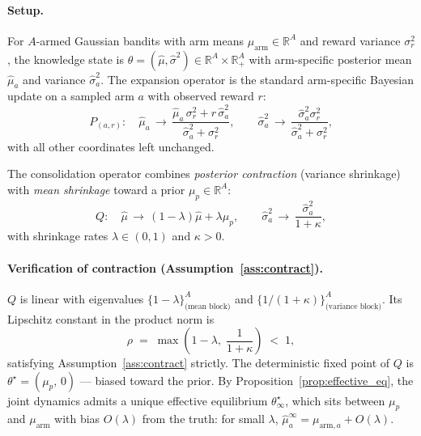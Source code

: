 \documentclass[12pt,a4paper]{article}
\newcommand{\R}{\mathbb{R}}
\begin{document}
\paragraph{Setup.}
For $A$-armed Gaussian bandits with arm means
$\mu_{\mathrm{arm}} \in \R^A$ and reward variance $\sigma_r^2$, the
knowledge state is $\theta = (\hat\mu, \hat\sigma^2) \in \R^A \times \R^A_+$
with arm-specific posterior mean $\hat\mu_a$ and variance $\hat\sigma_a^2$.
The expansion operator is the standard arm-specific Bayesian update on a
sampled arm $a$ with observed reward $r$:
\begin{equation}
\label{eq:bayesian_expansion}
P_{(a,r)}: \quad
  \hat\mu_a \,\to\, \frac{\hat\mu_a\,\sigma_r^2 + r\,\hat\sigma_a^2}{\hat\sigma_a^2 + \sigma_r^2},
  \qquad
  \hat\sigma_a^2 \,\to\, \frac{\hat\sigma_a^2 \sigma_r^2}{\hat\sigma_a^2 + \sigma_r^2},
\end{equation}
with all other coordinates left unchanged.

The consolidation operator combines \emph{posterior contraction} (variance
shrinkage) with \emph{mean shrinkage} toward a prior $\mu_p \in \R^A$:
\begin{equation}
\label{eq:bandit_Q}
Q: \quad
  \hat\mu \,\to\, (1-\lambda)\hat\mu + \lambda\mu_p,
  \qquad
  \hat\sigma_a^2 \,\to\, \frac{\hat\sigma_a^2}{1+\kappa},
\end{equation}
with shrinkage rates $\lambda \in (0, 1)$ and $\kappa > 0$.

\paragraph{Verification of contraction (Assumption~\ref{ass:contract}).}
$Q$ is linear with eigenvalues $\{1-\lambda\}^A_{\text{(mean block)}}$ and
$\{1/(1+\kappa)\}^A_{\text{(variance block)}}$. Its Lipschitz constant in
the product norm is
\[
  \rho \;=\; \max\!\left(1-\lambda,\; \frac{1}{1+\kappa}\right) \;<\; 1,
\]
satisfying Assumption~\ref{ass:contract} strictly. The deterministic fixed
point of $Q$ is $\theta^\star = (\mu_p,\, 0)$ — biased toward the prior. By
Proposition~\ref{prop:effective_eq}, the joint dynamics admits a unique
effective equilibrium $\theta^\star_\infty$, which sits between $\mu_p$ and
$\mu_{\mathrm{arm}}$ with bias $O(\lambda)$ from the truth: for small
$\lambda$, $\hat\mu^\infty_a = \mu_{\mathrm{arm},a} + O(\lambda)$.
\end{document}
